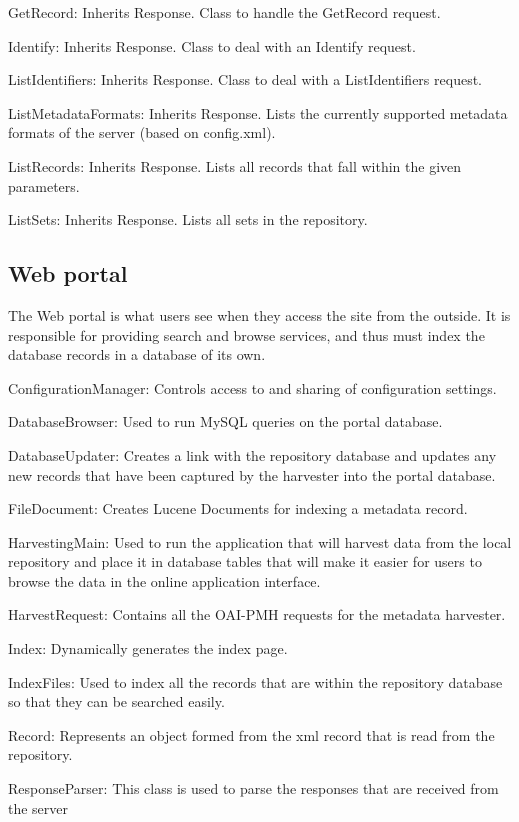 \documentclass[a4paper,11pt]{article}
\begin{document}
GetRecord: Inherits Response. Class to handle the GetRecord request.

Identify: Inherits Response. Class to deal with an Identify request.

ListIdentifiers: Inherits Response. Class to deal with a ListIdentifiers request.

ListMetadataFormats: Inherits Response. Lists the currently supported metadata formats of the server (based on config.xml).

ListRecords: Inherits Response. Lists all records that fall within the given parameters.

ListSets: Inherits Response. Lists all sets in the repository.

\subsection{Web portal}

The Web portal is what users see when they access the site from the outside. It is responsible for providing search and browse services, and thus must index the database records in a database of its own.

ConfigurationManager: Controls access to and sharing of configuration settings.

DatabaseBrowser: Used to run MySQL queries on the portal database.

DatabaseUpdater: Creates a link with the repository database and updates any new records that have been captured by the harvester into the portal database.

FileDocument: Creates Lucene Documents for indexing a metadata record.

HarvestingMain: Used to run the application that will harvest data from the local repository and place it in database tables that will make it easier for users to browse the data in the online application interface.

HarvestRequest: Contains all the OAI-PMH requests for the metadata harvester.

Index: Dynamically generates the index page.

IndexFiles: Used to index all the records that are within the repository database so that they can be searched easily.

Record: Represents an object formed from the xml record that is read from the repository.

ResponseParser: This class is used to parse the responses that are received from the server
\end{document}
